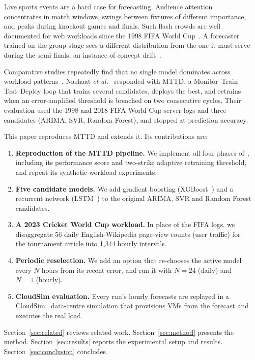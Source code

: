 \documentclass[journal,onecolumn,11pt]{IEEEtran}
\begin{document}
Live sports events are a hard case for forecasting. Audience attention concentrates in match windows, swings between fixtures of different importance, and peaks during knockout games and finals. Such flash crowds are well documented for web workloads since the 1998 FIFA World Cup~\cite{arlitt2000,jung2002}. A forecaster trained on the group stage sees a different distribution from the one it must serve during the semi-finals, an instance of concept drift~\cite{gama2014}.

Comparative studies repeatedly find that no single model dominates across workload patterns~\cite{calheiros2015,kim2016,liu2017,cetinski2015}. Nashaat \emph{et al.}~\cite{nashaat2026} responded with MTTD, a Monitor--Train--Test--Deploy loop that trains several candidates, deploys the best, and retrains when an error-amplified threshold is breached on two consecutive cycles. Their evaluation used the 1998 and 2018 FIFA World Cup server logs and three candidates (ARIMA, SVR, Random Forest), and stopped at prediction accuracy.

This paper reproduces MTTD and extends it. Its contributions are:
\begin{enumerate}
\item \textbf{Reproduction of the MTTD pipeline.} We implement all four phases of~\cite{nashaat2026}, including its performance score and two-strike adaptive retraining threshold, and repeat its synthetic-workload experiments.
\item \textbf{Five candidate models.} We add gradient boosting (XGBoost~\cite{chen2016}) and a recurrent network (LSTM~\cite{hochreiter1997}) to the original ARIMA, SVR and Random Forest candidates.
\item \textbf{A 2023 Cricket World Cup workload.} In place of the FIFA logs, we disaggregate 56 daily English-Wikipedia page-view counts (user traffic) for the tournament article into 1,344 hourly intervals.
\item \textbf{Periodic reselection.} We add an option that re-chooses the active model every $N$ hours from its recent error, and run it with $N=24$ (daily) and $N=1$ (hourly).
\item \textbf{CloudSim evaluation.} Every run's hourly forecasts are replayed in a CloudSim~\cite{calheiros2011} data-centre simulation that provisions VMs from the forecast and executes the real load.
\end{enumerate}
Section~\ref{sec:related} reviews related work. Section~\ref{sec:method} presents the method. Section~\ref{sec:results} reports the experimental setup and results. Section~\ref{sec:conclusion} concludes.
\end{document}
